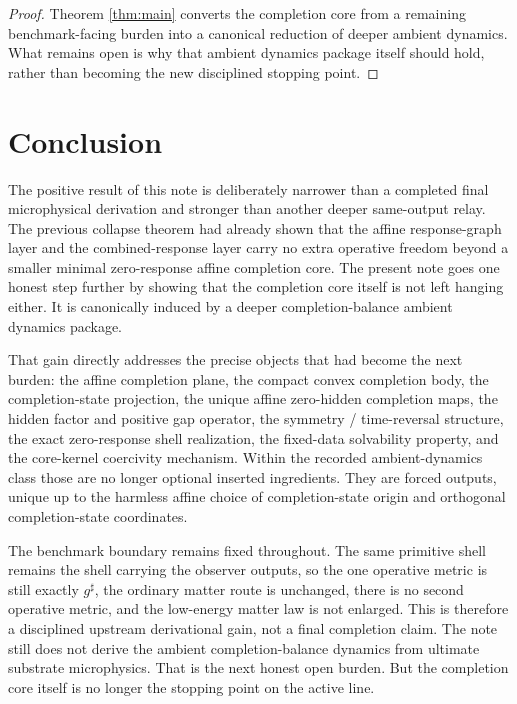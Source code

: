 \documentclass[11pt]{article}
\newcommand{\CompletedMetric}{g^{\sharp}}
\begin{document}
\begin{proof}
Theorem \ref{thm:main} converts the completion core from a remaining benchmark-facing burden into a canonical reduction of deeper ambient dynamics. What remains open is why that ambient dynamics package itself should hold, rather than becoming the new disciplined stopping point.
\end{proof}

\section{Conclusion}

The positive result of this note is deliberately narrower than a completed final microphysical derivation and stronger than another deeper same-output relay. The previous collapse theorem had already shown that the affine response-graph layer and the combined-response layer carry no extra operative freedom beyond a smaller minimal zero-response affine completion core. The present note goes one honest step further by showing that the completion core itself is not left hanging either. It is canonically induced by a deeper completion-balance ambient dynamics package.

That gain directly addresses the precise objects that had become the next burden: the affine completion plane, the compact convex completion body, the completion-state projection, the unique affine zero-hidden completion maps, the hidden factor and positive gap operator, the symmetry / time-reversal structure, the exact zero-response shell realization, the fixed-data solvability property, and the core-kernel coercivity mechanism. Within the recorded ambient-dynamics class those are no longer optional inserted ingredients. They are forced outputs, unique up to the harmless affine choice of completion-state origin and orthogonal completion-state coordinates.

The benchmark boundary remains fixed throughout. The same primitive shell remains the shell carrying the observer outputs, so the one operative metric is still exactly \(\CompletedMetric\), the ordinary matter route is unchanged, there is no second operative metric, and the low-energy matter law is not enlarged. This is therefore a disciplined upstream derivational gain, not a final completion claim. The note still does not derive the ambient completion-balance dynamics from ultimate substrate microphysics. That is the next honest open burden. But the completion core itself is no longer the stopping point on the active line.
\end{document}
